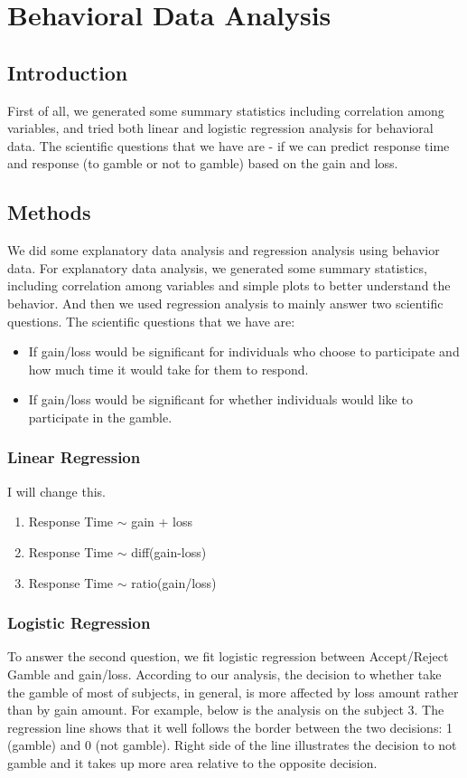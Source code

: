 \section{Behavioral Data Analysis}

\subsection{Introduction}
\noindent
First of all, we generated some summary statistics including correlation among variables, and tried both linear and logistic regression analysis for behavioral data. The scientific questions that we have are - if we can predict response time and response (to gamble or not to gamble) based on the gain and loss.

\subsection{Methods}
\noindent
We did some explanatory data analysis and regression analysis using behavior 
data. For explanatory data analysis, we generated some summary statistics, 
including correlation among variables and simple plots to better understand 
the behavior. And then we used regression analysis to mainly answer two 
scientific questions. The scientific questions that we have are:
\begin{itemize}
\item If gain/loss would be significant for individuals who choose to 
participate and how much time it would take for them to respond.
\item If gain/loss would be significant for whether individuals would like to 
participate in the gamble. 
\end {itemize}

\subsubsection {Linear Regression}
I will change this.
\begin{enumerate}
\item  Response Time $\sim$ gain + loss
\item  Response Time $\sim$ diff(gain-loss)
\item  Response Time $\sim$ ratio(gain/loss)
\end {enumerate}

\subsubsection {Logistic Regression}
\noindent
To answer the second question, we fit logistic regression between Accept/Reject
Gamble and gain/loss. According to our analysis, the decision to whether take 
the gamble of most of subjects, in general, is more affected by loss amount 
rather than by gain amount.  For example, below is the analysis on the subject 
3. The regression line shows that it well follows the border between the two 
decisions: 1 (gamble) and 0 (not gamble). Right side of the line illustrates 
the decision to not gamble and it takes up more area relative to the opposite 
decision.
